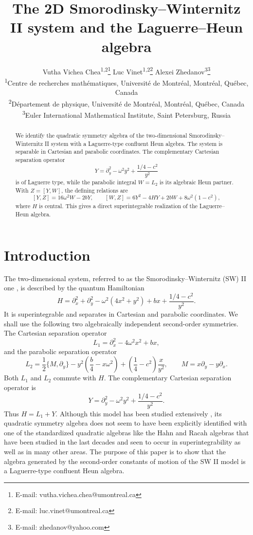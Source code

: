 \documentclass[11pt]{article}
\title{The 2D Smorodinsky--Winternitz II system and the Laguerre--Heun algebra}
\author{
Vutha Vichea Chea\textsuperscript{1,2}\thanks{E-mail: vutha.vichea.chea@umontreal.ca}
\quad
Luc Vinet\textsuperscript{1,2}\thanks{E-mail: luc.vinet@umontreal.ca}
\quad
Alexei Zhedanov\textsuperscript{3}\thanks{E-mail: zhedanov@yahoo.com}
\\[0.3cm]
\textsuperscript{1}\small Centre de recherches mathématiques, Université de Montréal, Montréal, Québec, Canada\\
\textsuperscript{2}\small Département de physique, Université de Montréal, Montréal, Québec, Canada\\
\textsuperscript{3}\small Euler International Mathematical Institute, Saint Petersburg, Russia
}
\date{}
\numberwithin{equation}{section}
\theoremstyle{definition}
\theoremstyle{remark}
\newcommand{\ac}[2]{\{#1,#2\}}
\begin{document}
\maketitle

\begin{abstract}
We identify the quadratic symmetry algebra of the two-dimensional
Smorodinsky--Winternitz II system with a Laguerre-type confluent Heun algebra.
The system is separable in Cartesian and parabolic coordinates.  The
complementary Cartesian separation operator
\[
  Y=\partial_y^2-\omega^2y^2+\frac{1/4-c^2}{y^2}
\]
is of Laguerre type, while the parabolic integral \(W=L_2\) is its algebraic
Heun partner.  With \(Z=[Y,W]\), the defining relations are
\[
 [Y,Z]=16\omega^2W-2bY,\qquad
 [W,Z]=6Y^2-4HY+2bW+8\omega^2(1-c^2),
\]
where \(H\) is central.  This gives a direct superintegrable realization of
the Laguerre--Heun algebra.
\end{abstract}

\section{Introduction}

The two-dimensional system, referred to as the Smorodinsky--Winternitz (SW) II one
\cite{winternitz1966symmetry}, is described by the quantum Hamiltonian
\begin{equation}
  H=\partial_x^2+\partial_y^2
    -\omega^2(4x^2+y^2)+bx+\frac{1/4-c^2}{y^2}.
  \label{eq:intro-H}
\end{equation}
It is superintegrable and separates in Cartesian and parabolic coordinates.
We shall use the following two algebraically independent second-order
symmetries.  The Cartesian separation operator 
\begin{equation}
  L_1=\partial_x^2-4\omega^2x^2+bx,
  \label{eq:intro-L1}
\end{equation}
and the parabolic separation operator 
\begin{equation}
  L_2=\frac12\ac{M}{\partial_y}
      -y^2\left(\frac b4-x\omega^2\right)
      +\left(\frac14-c^2\right)\frac{x}{y^2},
  \qquad
  M=x\partial_y-y\partial_x .
  \label{eq:intro-L2}
\end{equation}
Both \(L_1\) and \(L_2\) commute with \(H\).  The complementary Cartesian
separation operator is
\begin{equation}
  Y=
  \partial_y^2-\omega^2y^2+\frac{1/4-c^2}{y^2}.
  \label{eq:intro-Y}
\end{equation}
Thus \(H=L_1+Y\).  Although this model has been studied extensively
\cite{miller2013classical}, its quadratic symmetry algebra does not seem to
have been explicitly identified with one of the standardized quadratic algebras like the Hahn and Racah algebras  that have been studied in the last decades and seen to occur in superintegrability as well as in many other areas.  The purpose of this paper is to show that the algebra
generated by the second-order constants of motion of the SW II model is a Laguerre-type
confluent Heun algebra.
\end{document}
